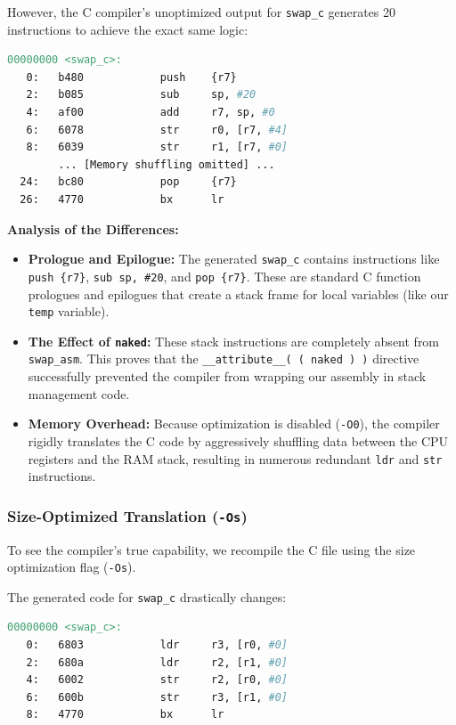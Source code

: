 However, the C compiler's unoptimized output for \texttt{swap\_c} generates 20 instructions to achieve the exact same logic:
\begin{lstlisting}[language=make]
00000000 <swap_c>:
   0:   b480            push    {r7}
   2:   b085            sub     sp, #20
   4:   af00            add     r7, sp, #0
   6:   6078            str     r0, [r7, #4]
   8:   6039            str     r1, [r7, #0]
        ... [Memory shuffling omitted] ...
  24:   bc80            pop     {r7}
  26:   4770            bx      lr
\end{lstlisting}

\textbf{Analysis of the Differences:}
\begin{itemize}
    \item \textbf{Prologue and Epilogue:} The generated \texttt{swap\_c} contains instructions like \texttt{push \{r7\}}, \texttt{sub sp, \#20}, and \texttt{pop \{r7\}}. These are standard C function prologues and epilogues that create a stack frame for local variables (like our \texttt{temp} variable).
    \item \textbf{The Effect of \texttt{naked}:} These stack instructions are completely absent from \texttt{swap\_asm}. This proves that the \texttt{\_\_attribute\_\_( ( naked ) )} directive successfully prevented the compiler from wrapping our assembly in stack management code.
    \item \textbf{Memory Overhead:} Because optimization is disabled (\texttt{-O0}), the compiler rigidly translates the C code by aggressively shuffling data between the CPU registers and the RAM stack, resulting in numerous redundant \texttt{ldr} and \texttt{str} instructions.
\end{itemize}

\subsubsection{Size-Optimized Translation (\texttt{-Os})}
To see the compiler's true capability, we recompile the C file using the size optimization flag (\texttt{-Os}). 

The generated code for \texttt{swap\_c} drastically changes:
\begin{lstlisting}[language=make]
00000000 <swap_c>:
   0:   6803            ldr     r3, [r0, #0]
   2:   680a            ldr     r2, [r1, #0]
   4:   6002            str     r2, [r0, #0]
   6:   600b            str     r3, [r1, #0]
   8:   4770            bx      lr
\end{lstlisting}

